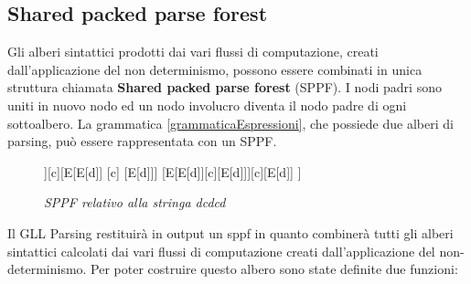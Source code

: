 \subsection{Shared packed parse forest}
Gli alberi sintattici prodotti dai vari flussi di computazione, creati dall'applicazione del non determinismo, possono essere combinati in unica struttura chiamata \textbf{Shared packed parse forest} (SPPF). I nodi padri \cite{tesi: lr} sono uniti in nuovo nodo ed un nodo involucro diventa il nodo padre di ogni sottoalbero. La grammatica \ref{grammaticaEspressioni}, che possiede due alberi di parsing, può essere rappresentata con un SPPF.\par 
\begin{figure}[hbpb]
	\centering
	\begin{forest}
	[E
	[E[d]][c][E[E[d]] [c] [E[d]]]
	[E[E[d]][c][E[d]]][c][E[d]]
	]
	\end{forest}
	\caption{\textit{SPPF relativo alla stringa dcdcd}}\label{sppf}
\end{figure}
\noindent Il GLL Parsing restituirà in output un sppf in quanto combinerà tutti gli alberi sintattici calcolati dai vari flussi di computazione creati dall'applicazione del non-determinismo. Per poter costruire questo albero sono state definite due funzioni:
